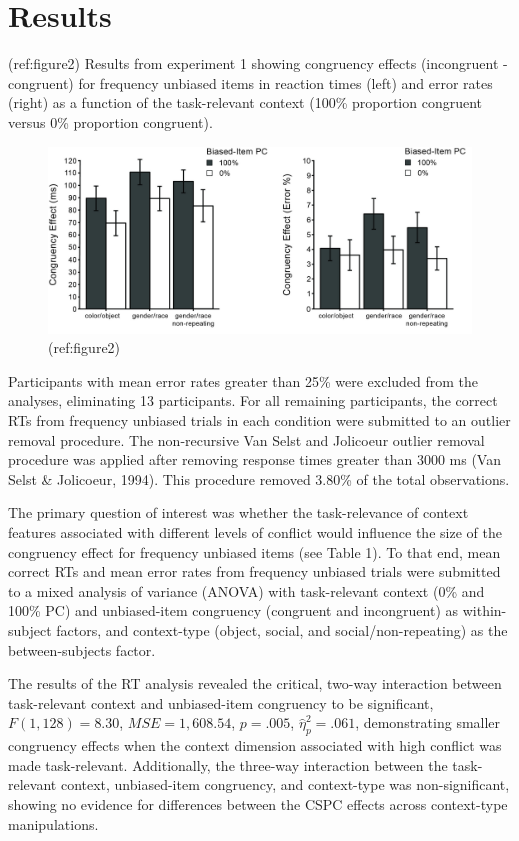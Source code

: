 \documentclass[english,,man,floatsintext]{apa6}
\begin{document}
\hypertarget{results}{%
\section{Results}\label{results}}

(ref:figure2)
Results from experiment 1 showing congruency effects (incongruent - congruent) for frequency unbiased items in reaction times (left) and error rates (right) as a function of the task-relevant context (100\% proportion congruent versus 0\% proportion congruent).

\begin{figure}

{\centering \includegraphics[width=0.75\linewidth]{images/E1_bar} 

}

\caption{(ref:figure2)}\label{fig:figure2}
\end{figure}

Participants with mean error rates greater than 25\% were excluded from the analyses, eliminating 13 participants. For all remaining participants, the correct RTs from frequency unbiased trials in each condition were submitted to an outlier removal procedure. The non-recursive Van Selst and Jolicoeur outlier removal procedure was applied after removing response times greater than 3000 ms (Van Selst \& Jolicoeur, 1994). This procedure removed 3.80\% of the total observations.

The primary question of interest was whether the task-relevance of context features associated with different levels of conflict would influence the size of the congruency effect for frequency unbiased items (see Table 1). To that end, mean correct RTs and mean error rates from frequency unbiased trials were submitted to a mixed analysis of variance (ANOVA) with task-relevant context (0\% and 100\% PC) and unbiased-item congruency (congruent and incongruent) as within-subject factors, and context-type (object, social, and social/non-repeating) as the between-subjects factor.

The results of the RT analysis revealed the critical, two-way interaction between task-relevant context and unbiased-item congruency to be significant, \(F(1, 128) = 8.30\), \(\mathit{MSE} = 1,608.54\), \(p = .005\), \(\hat{\eta}^2_p = .061\), demonstrating smaller congruency effects when the context dimension associated with high conflict was made task-relevant. Additionally, the three-way interaction between the task-relevant context, unbiased-item congruency, and context-type was non-significant, showing no evidence for differences between the CSPC effects across context-type manipulations.
\end{document}
